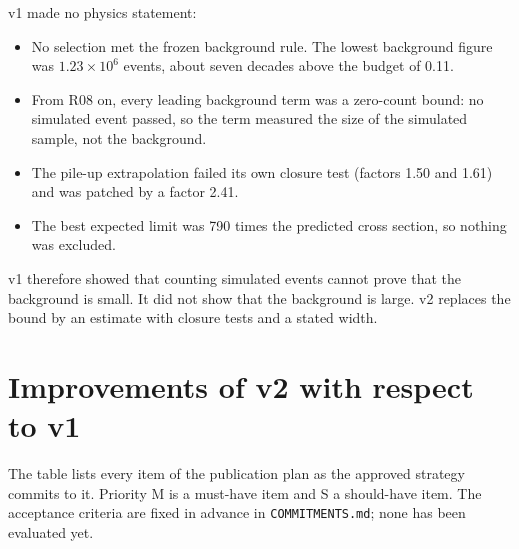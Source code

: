 \documentclass[11pt,a4paper]{article}
\begin{document}
v1 made no physics statement:
\begin{itemize}
\item No selection met the frozen background rule. The lowest background figure was $1.23\times10^{6}$ events,
      about seven decades above the budget of 0.11.
\item From R08 on, every leading background term was a zero-count bound: no simulated event passed, so the term
      measured the size of the simulated sample, not the background.
\item The pile-up extrapolation failed its own closure test (factors 1.50 and 1.61) and was patched by a factor
      2.41.
\item The best expected limit was 790 times the predicted cross section, so nothing was excluded.
\end{itemize}
v1 therefore showed that counting simulated events cannot prove that the background is small. It did not show
that the background is large. v2 replaces the bound by an estimate with closure tests and a stated width.

\section{Improvements of v2 with respect to v1}
The table lists every item of the publication plan as the approved strategy commits to it. Priority M is a
must-have item and S a should-have item. The acceptance criteria are fixed in advance in
\texttt{COMMITMENTS.md}; none has been evaluated yet.
\end{document}
